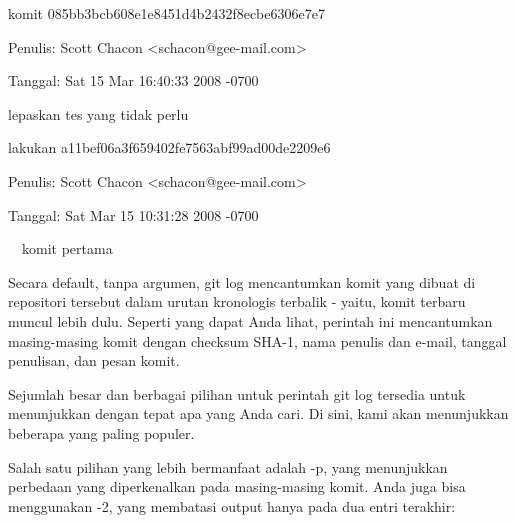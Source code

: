\noindent 
 \hspace*{0.5in} komit 085bb3bcb608e1e8451d4b2432f8ecbe6306e7e7 \par
\noindent 
 \hspace*{0.5in} Penulis: Scott Chacon <schacon@gee-mail.com> \par
\noindent 
 \hspace*{0.5in} Tanggal: Sat 15 Mar 16:40:33 2008 -0700 \par
\noindent 
lepaskan tes yang tidak perlu \par
\noindent 
 \hspace*{0.5in} lakukan a11bef06a3f659402fe7563abf99ad00de2209e6 \par
\noindent 
 \hspace*{0.5in} Penulis: Scott Chacon <schacon@gee-mail.com> \par
\noindent 
 \hspace*{0.5in} Tanggal: Sat Mar 15 10:31:28 2008 -0700 \par
\noindent 
 $  $ $  $ $  $ $  $komit pertama \par
 \vspace{\baselineskip}
\noindent 
Secara default, tanpa argumen, git log mencantumkan komit yang dibuat di repositori tersebut dalam urutan kronologis terbalik - yaitu, komit terbaru muncul lebih dulu. Seperti yang dapat Anda lihat, perintah ini mencantumkan masing-masing komit dengan checksum SHA-1, nama penulis dan e-mail, tanggal penulisan, dan pesan komit. \par
\noindent 
Sejumlah besar dan berbagai pilihan untuk perintah git log tersedia untuk menunjukkan dengan tepat apa yang Anda cari. Di sini, kami akan menunjukkan beberapa yang paling populer. \par
\vspace{\baselineskip}
\noindent 
Salah satu pilihan yang lebih bermanfaat adalah -p, yang menunjukkan perbedaan yang diperkenalkan pada masing-masing komit. Anda juga bisa menggunakan -2, yang membatasi output hanya pada dua entri terakhir: \par

